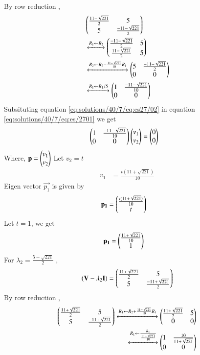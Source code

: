 By row reduction , 
\begin{align}
    &\begin{pmatrix}\frac{11-\sqrt{221}}{2} & 5 \\5 & \frac{-11-\sqrt{221}}{2}\end{pmatrix}\\
    &\xleftrightarrow{R_1\leftarrow R_2}
    \begin{pmatrix}\frac{-11-\sqrt{221}}{2} & 5 \\ \frac{11-\sqrt{221}}{2} & 5\end{pmatrix}\\
 &\xleftrightarrow{R_2\leftarrow R_2-\frac{11-\sqrt{221}}{10}R_{1}}
    \begin{pmatrix}5 & \frac{-11-\sqrt{221}}{2} \\ 0& 0\end{pmatrix}\\
     &\xleftrightarrow{R_1\leftarrow R_1/5}
    \begin{pmatrix}1 & \frac{-11-\sqrt{221}}{10} \\ 0& 0\end{pmatrix}
    \label{eq:solutions/40/7/eq:es27/02}
\end{align}
Subsituting equation \ref{eq:solutions/40/7/eq:es27/02} in equation \ref{eq:solutions/40/7/eq:es/2701} we get
\begin{align}
        & \begin{pmatrix}1 & \frac{-11-\sqrt{221}}{10} \\ 0& 0\end{pmatrix}\begin{pmatrix}v_1 \\ v_2\end{pmatrix}=\begin{pmatrix}0 \\ 0\end{pmatrix}\label{eq:solutions/40/7/eq:es27/eqei1}
\end{align}
Where, $\mathbf{p}=\begin{pmatrix}v_1\\v_2\end{pmatrix}$
Let $v_2=t$
\begin{align}
    v_1&=\frac{t(11+\sqrt{221})}{10}
\end{align}
Eigen vector $\vec{p_1}$ is given by
\begin{align}
    \mathbf{p_1}&=\begin{pmatrix}\frac{t(11+\sqrt{221})}{10} \\ t\end{pmatrix}
\end{align}
Let $t=1$, we get
\begin{align}
        \mathbf{p_1}&=\begin{pmatrix}\frac{11+\sqrt{221}}{10} \\1 \end{pmatrix}\label{eq:solutions/40/7/eq:es27/eqp1}
\end{align}
For $\lambda_2=\frac{5-\sqrt{221}}{2}$ ,
\begin{align}
    (\mathbf{V}-\lambda_2\mathbf{I})=\begin{pmatrix}\frac{11+\sqrt{221}}{2} & 5 \\5 & \frac{-11+\sqrt{221}}{2}\end{pmatrix}
\end{align}
By row reduction , 
\begin{align}
    \begin{pmatrix}\frac{11+\sqrt{221}}{2} & 5 \\5 & \frac{-11+\sqrt{221}}{2}\end{pmatrix}
    \xleftrightarrow{R_1\leftarrow R_2+ \frac{11-\sqrt{221}}{10}R_1}
     \begin{pmatrix}\frac{11+\sqrt{221}}{2} &5\\ 0& 0\end{pmatrix}\\  
 \xleftrightarrow{R_1\leftarrow
 \frac{R_1}{\frac{11+\sqrt{221}}{10}}}
    \begin{pmatrix}1 & \frac{10}{11+\sqrt{221}} \\ 0& 0\end{pmatrix}
    \label{eq:solutions/40/7/eq:es27eqs02}
\end{align}
